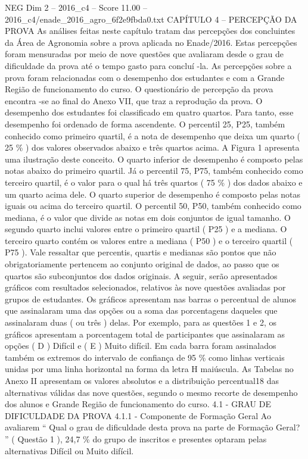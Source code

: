 \begin{textsample}{NEG Dim 2 – 2016\_c4 – Score 11.00 – 2016\_c4/enade\_2016\_agro\_6f2e9fbda0.txt}  \label{ex:f2_neg_362}
CAPÍTULO 4 – PERCEPÇÃO DA PROVA As análises feitas neste capítulo tratam das percepções dos concluintes da Área de Agronomia sobre a prova aplicada no Enade/2016.
Estas percepções foram mensuradas por meio de nove questões que avaliaram desde o grau de dificuldade da prova até o tempo gasto para concluí -la.
As percepções sobre a prova foram relacionadas com o desempenho dos estudantes e com a Grande Região de funcionamento do curso.
O questionário de percepção da prova encontra -se ao final do Anexo VII, que traz a reprodução da prova.
O desempenho dos estudantes foi classificado em quatro quartos.
Para tanto, esse desempenho foi ordenado de forma ascendente.
O percentil 25, P25, também conhecido como primeiro quartil, é a nota de desempenho que deixa um quarto ( 25 \% ) dos valores observados abaixo e três quartos acima.
A Figura 1 apresenta uma ilustração deste conceito.
O quarto inferior de desempenho é composto pelas notas abaixo do primeiro quartil.
Já o percentil 75, P75, também conhecido como terceiro quartil, é o valor para o qual há três quartos ( 75 \% ) dos dados abaixo e um quarto acima dele.
O quarto superior de desempenho é composto pelas notas iguais ou acima do terceiro quartil.
O percentil 50, P50, também conhecido como mediana, é o valor que divide as notas em dois conjuntos de igual tamanho.
O segundo quarto inclui valores entre o primeiro quartil ( P25 ) e a mediana.
O terceiro quarto contém os valores entre a mediana ( P50 ) e o terceiro quartil ( P75 ).
Vale ressaltar que percentis, quartis e medianas são pontos que não obrigatoriamente pertencem ao conjunto original de dados, ao passo que os quartos são subconjuntos dos dados originais.
A seguir, serão apresentados gráficos com resultados selecionados, relativos às nove questões avaliadas por grupos de estudantes.
Os gráficos apresentam nas barras o percentual de alunos que assinalaram uma das opções ou a soma das porcentagens daqueles que assinalaram duas ( ou três ) delas.
Por exemplo, para as questões 1 e 2, os gráficos apresentam a porcentagem total de participantes que assinalaram as opções ( D ) Difícil e ( E ) Muito difícil.
Em cada barra foram assinalados também os extremos do intervalo de confiança de 95 \% como linhas verticais unidas por uma linha horizontal na forma da letra H maiúscula.
As Tabelas no Anexo II apresentam os valores absolutos e a distribuição percentual18 das alternativas válidas das nove questões, segundo o mesmo recorte de desempenho dos alunos e Grande Região de funcionamento do curso. 4.1 - GRAU DE DIFICULDADE DA PROVA 4.1.1 - Componente de Formação Geral Ao avaliarem “ Qual o grau de dificuldade desta prova na parte de Formação Geral? ” ( Questão 1 ), 24,7 \% do grupo de inscritos e presentes optaram pelas alternativas Difícil ou Muito difícil.

\end{textsample}
